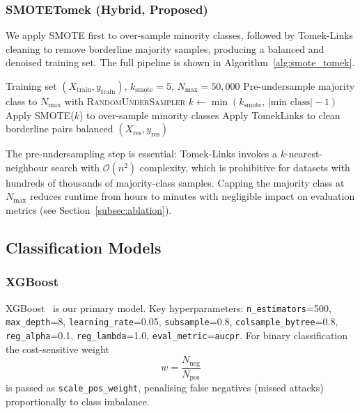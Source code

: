 \documentclass[conference]{IEEEtran}
\begin{document}
\subsubsection{SMOTETomek (Hybrid, Proposed)}
We apply SMOTE first to over-sample minority classes, followed by
Tomek-Links cleaning to remove borderline majority samples, producing
a balanced and denoised training set.  The full pipeline is shown in
Algorithm~\ref{alg:smote_tomek}.

\begin{algorithm}[ht]
\caption{Scalable SMOTETomek}\label{alg:smote_tomek}
\begin{algorithmic}[1]
\Require Training set $(X_{\text{train}}, y_{\text{train}})$,
         $k_{\text{smote}}=5$, $N_{\max}=50{,}000$
    \State Pre-undersample majority class to $N_{\max}$ with
           \textsc{RandomUnderSampler}
\EndIf
\State $k \leftarrow \min(k_{\text{smote}},\,|\text{min class}| - 1)$
\State Apply SMOTE($k$) to over-sample minority classes
\State Apply TomekLinks to clean borderline pairs
\State \Return balanced $(X_{\text{res}}, y_{\text{res}})$
\end{algorithmic}
\end{algorithm}

The pre-undersampling step is essential: Tomek-Links invokes a
$k$-nearest-neighbour search with $\mathcal{O}(n^2)$ complexity,
which is prohibitive for datasets with hundreds of thousands of
majority-class samples.  Capping the majority class at $N_{\max}$
reduces runtime from hours to minutes with negligible impact on
evaluation metrics (see Section~\ref{subsec:ablation}).

\subsection{Classification Models}
\label{subsec:models}

\subsubsection{XGBoost}
XGBoost~\cite{chen2016xgboost} is our primary model.
Key hyperparameters: \texttt{n\_estimators}=500,
\texttt{max\_depth}=8, \texttt{learning\_rate}=0.05,
\texttt{subsample}=0.8, \texttt{colsample\_bytree}=0.8,
\texttt{reg\_alpha}=0.1, \texttt{reg\_lambda}=1.0,
\texttt{eval\_metric}=\texttt{aucpr}.
For binary classification the cost-sensitive weight
\begin{equation}
  w = \frac{N_{\text{neg}}}{N_{\text{pos}}}
  \label{eq:spw}
\end{equation}
is passed as \texttt{scale\_pos\_weight}, penalising
false negatives (missed attacks) proportionally to class imbalance.
\end{document}
